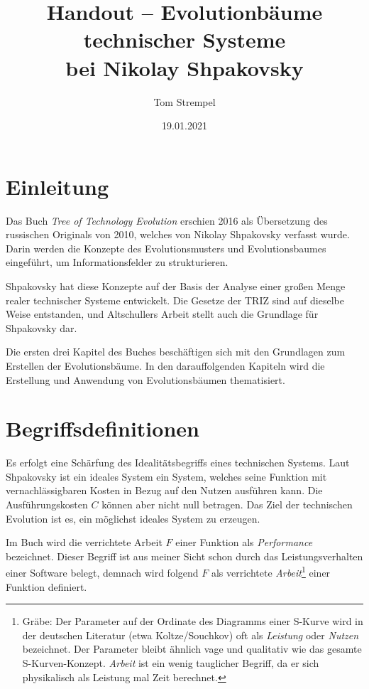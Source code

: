 \documentclass[11pt,a4paper]{article}
\title{Handout -- Evolutionbäume technischer Systeme\\ bei Nikolay Shpakovsky}
\author{Tom Strempel}
\date{19.01.2021}
\begin{document}
\maketitle

\section{Einleitung}

Das Buch \emph{Tree of Technology Evolution} erschien 2016 als Übersetzung des
russischen Originals von 2010, welches von Nikolay Shpakovsky verfasst wurde.
Darin werden die Konzepte des Evolutionsmusters und Evolutionsbaumes
eingeführt, um Informationsfelder zu strukturieren.

Shpakovsky hat diese Konzepte auf der Basis der Analyse einer großen Menge
realer technischer Systeme entwickelt. Die Gesetze der TRIZ sind auf dieselbe
Weise entstanden, und Altschullers Arbeit stellt auch die Grundlage für
Shpakovsky dar.

Die ersten drei Kapitel des Buches beschäftigen sich mit den Grundlagen zum
Erstellen der Evolutionsbäume. In den darauffolgenden Kapiteln wird die
Erstellung und Anwendung von Evolutionsbäumen thematisiert.

\section{Begriffsdefinitionen}

Es erfolgt eine Schärfung des Idealitätsbegriffs eines technischen Systems.
Laut Shpakovsky ist ein ideales System ein System, welches seine Funktion mit
vernachlässigbaren Kosten in Bezug auf den Nutzen ausführen kann. Die
Ausführungskosten $C$ können aber nicht null betragen. Das Ziel der
technischen Evolution ist es, ein möglichst ideales System zu erzeugen.

Im Buch wird die verrichtete Arbeit $F$ einer Funktion als \emph{Performance}
bezeichnet. Dieser Begriff ist aus meiner Sicht schon durch das
Leistungsverhalten einer Software belegt, demnach wird folgend $F$ als
verrichtete \emph{Arbeit}\footnote{Gräbe: Der Parameter auf der Ordinate des
  Diagramms einer S-Kurve wird in der deutschen Literatur (etwa
  Koltze/Souchkov) oft als \emph{Leistung} oder \emph{Nutzen} bezeichnet.  Der
  Parameter bleibt ähnlich vage und qualitativ wie das gesamte
  S-Kurven-Konzept.  \emph{Arbeit} ist ein wenig tauglicher Begriff, da er
  sich physikalisch als Leistung mal Zeit berechnet.}  einer Funktion
definiert.
\end{document}
